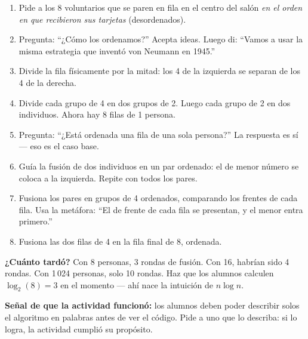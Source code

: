 \documentclass[12pt, oneside]{article}
\begin{document}
\begin{enumerate}
  \item Pide a los 8 voluntarios que se paren en fila en el centro del salón
        \textit{en el orden en que recibieron sus tarjetas} (desordenados).

  \item Pregunta: ``¿Cómo los ordenamos?'' Acepta ideas. Luego di: ``Vamos a
        usar la misma estrategia que inventó von Neumann en 1945.''

  \item Divide la fila físicamente por la mitad: los 4 de la izquierda se
        separan de los 4 de la derecha.

  \item Divide cada grupo de 4 en dos grupos de 2. Luego cada grupo de 2 en
        dos individuos. Ahora hay 8 filas de 1 persona.

  \item Pregunta: ``¿Está ordenada una fila de una sola persona?'' La respuesta
        es sí — eso es el caso base.

  \item Guía la fusión de dos individuos en un par ordenado: el de menor número
        se coloca a la izquierda. Repite con todos los pares.

  \item Fusiona los pares en grupos de 4 ordenados, comparando los frentes de
        cada fila. Usa la metáfora: ``El de frente de cada fila se presentan,
        y el menor entra primero.''

  \item Fusiona las dos filas de 4 en la fila final de 8, ordenada.
\end{enumerate}

\begin{notaprofesor}
  \textbf{¿Cuánto tardó?} Con 8 personas, 3 rondas de fusión. Con 16, habrían
  sido 4 rondas. Con 1\,024 personas, solo 10 rondas. Haz que los alumnos
  calculen $\log_2(8) = 3$ en el momento — ahí nace la intuición de $n \log n$.
  \par\smallskip
  \textbf{Señal de que la actividad funcionó:} los alumnos deben poder
  describir solos el algoritmo en palabras antes de ver el código.
  Pide a uno que lo describa: si lo logra, la actividad cumplió su propósito.
\end{notaprofesor}

\end{document}
